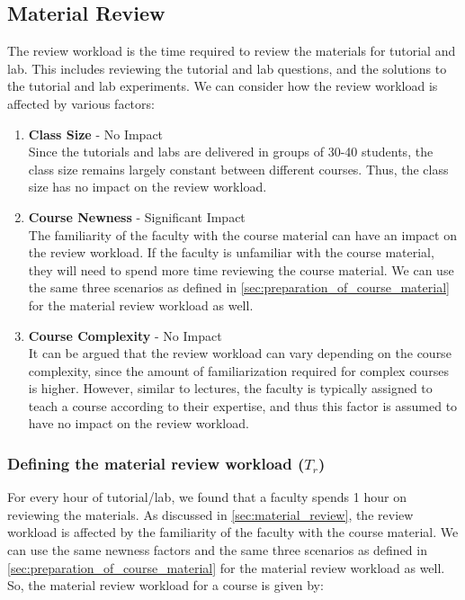 \subsection{Material Review}
\label{sec:material_review}

The review workload is the time required to review the materials for tutorial and lab. This includes reviewing the tutorial and lab questions, and the solutions to the tutorial and lab experiments. We can consider how the review workload is affected by various factors:

\begin{enumerate}
  \item \textbf{Class Size} - No Impact \\
        Since the tutorials and labs are delivered in groups of 30-40 students, the class size remains largely constant between different courses. Thus, the class size has no impact on the review workload.

  \item \textbf{Course Newness} - Significant Impact \\
        The familiarity of the faculty with the course material can have an impact on the review workload. If the faculty is unfamiliar with the course material, they will need to spend more time reviewing the course material. We can use the same three scenarios as defined in \autoref{sec:preparation_of_course_material} for the material review workload as well.

  \item \textbf{Course Complexity} - No Impact \\
        It can be argued that the review workload can vary depending on the course complexity, since the amount of familiarization required for complex courses is higher. However, similar to lectures, the faculty is typically assigned to teach a course according to their expertise, and thus this factor is assumed to have no impact on the review workload.

\end{enumerate}


\subsubsection{Defining the material review workload (\(T_r\))}

For every hour of tutorial/lab, we found that a faculty spends 1 hour on reviewing the materials. As discussed in \autoref{sec:material_review}, the review workload is affected by the familiarity of the faculty with the course material. We can use the same newness factors and the same three scenarios as defined in \autoref{sec:preparation_of_course_material} for the material review workload as well. So, the material review workload for a course is given by:

